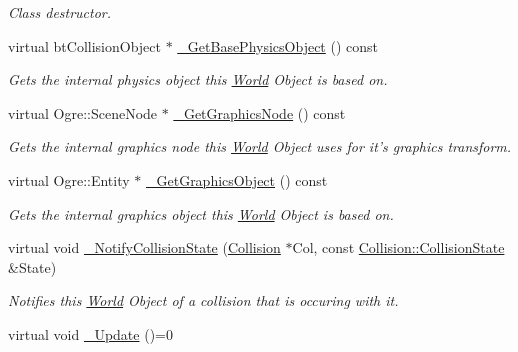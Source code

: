 \begin{DoxyCompactItemize}
\begin{DoxyCompactList}\small\item\em Class destructor. \item\end{DoxyCompactList}\item 
virtual btCollisionObject $\ast$ \hyperlink{classMezzanine_1_1WorldObject_a4564b948a585aac1764ee13f2a61c110}{\_\-GetBasePhysicsObject} () const 
\begin{DoxyCompactList}\small\item\em Gets the internal physics object this \hyperlink{classMezzanine_1_1World}{World} Object is based on. \item\end{DoxyCompactList}\item 
virtual Ogre::SceneNode $\ast$ \hyperlink{classMezzanine_1_1WorldObject_a1123ace3f7730eaf1eb395b3aad714a4}{\_\-GetGraphicsNode} () const 
\begin{DoxyCompactList}\small\item\em Gets the internal graphics node this \hyperlink{classMezzanine_1_1World}{World} Object uses for it's graphics transform. \item\end{DoxyCompactList}\item 
virtual Ogre::Entity $\ast$ \hyperlink{classMezzanine_1_1WorldObject_ac01aba8d4eff2df4e68bb15e5b086660}{\_\-GetGraphicsObject} () const 
\begin{DoxyCompactList}\small\item\em Gets the internal graphics object this \hyperlink{classMezzanine_1_1World}{World} Object is based on. \item\end{DoxyCompactList}\item 
virtual void \hyperlink{classMezzanine_1_1WorldObject_aacf9e82bfb2f25ee309a1871a2032030}{\_\-NotifyCollisionState} (\hyperlink{classMezzanine_1_1Collision}{Collision} $\ast$Col, const \hyperlink{classMezzanine_1_1Collision_a24094c597061743dcd571f36077f4d19}{Collision::CollisionState} \&State)
\begin{DoxyCompactList}\small\item\em Notifies this \hyperlink{classMezzanine_1_1World}{World} Object of a collision that is occuring with it. \item\end{DoxyCompactList}\item 
\hypertarget{classMezzanine_1_1WorldObject_af54c2dd470b534a51f12baae51631359}{
virtual void \hyperlink{classMezzanine_1_1WorldObject_af54c2dd470b534a51f12baae51631359}{\_\-Update} ()=0}
\label{classMezzanine_1_1WorldObject_af54c2dd470b534a51f12baae51631359}


\end{DoxyCompactItemize}
